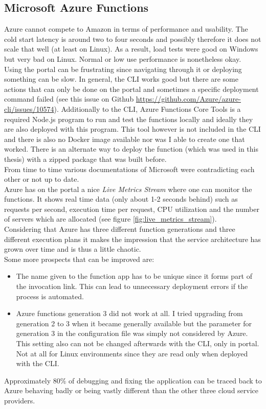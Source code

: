 \subsection*{Microsoft Azure Functions}
Azure cannot compete to Amazon in terms of performance and usability. The cold start latency is around two to four seconds and possibly therefore it does not scale that well (at least on Linux). As a result, load tests were good on Windows but very bad on Linux. Normal or low use performance is nonetheless okay.\\
Using the portal can be frustrating since navigating through it or deploying something can be slow. In general, the \gls{CLI} works good but there are some actions that can only be done on the portal and sometimes a specific deployment command failed (see this issue on Github  \href{https://github.com/Azure/azure-cli/issues/10574}{https://github.com/Azure/azure-cli/issues/10574}). Additionally to the \gls{CLI}, Azure Functions Core Tools is a required Node.js program to run and test the functions locally and ideally they are also deployed with this program. This tool however is not included in the \gls{CLI} and there is also no Docker image available nor was I able to create one that worked. There is an alternate way to deploy the function (which was used in this thesis) with a zipped package that was built before.\\ From time to time various documentations of Microsoft were contradicting each other or not up to date.\\
Azure has on the portal a nice \textit{Live Metrics Stream} where one can monitor the functions. It shows real time data (only about 1-2 seconds behind) such as requests per second, execution time per request, \gls{CPU} utilization and the number of servers which are allocated (see figure \ref{fig:live_metrics_stream}).\\
Considering that Azure has three different function generations and three different execution plans it makes the impression that the service architecture has grown over time and is thus a little chaotic.\\
Some more prospects that can be improved are:
\begin{itemize}
    \item The name given to the function app has to be unique since it forms part of the invocation link. This can lead to unnecessary deployment errors if the process is automated.
    \item Azure functions generation 3 did not work at all. I tried upgrading from generation 2 to 3 when it became generally available but the parameter for generation 3 in the configuration file was simply not considered by Azure. This setting also can not be changed afterwards with the \gls{CLI}, only in portal. Not at all for Linux environments since they are read only when deployed with the \gls{CLI}.
\end{itemize}
Approximately 80\% of debugging and fixing the application can be traced back to Azure behaving badly or being vastly different than the other three cloud service providers.
